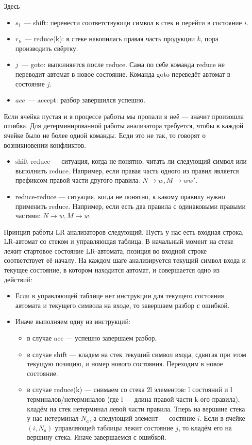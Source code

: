 Здесь
\begin{itemize}
  \item $s_i$~--- shift: перенести соответствующи символ в стек и перейти в состояние $i$.
  \item $r_k$~--- reduce(k): в стеке накопилась правая часть продукции $k$, пора производить свёртку.  
  \item $j$~--- goto: выполняется после reduce. Сама по себе команда reduce не переводит автомат в новое состояние. Команда goto переведёт автомат в состояние $j$.
  \item $acc$~--- accept: разбор завершился успешно. 
\end{itemize}

Если ячейка пустая и в процессе работы мы пропали в неё --- значит произошла ошибка. Для детерминированной работы анализатора требуется, чтобы в каждой ячейке было не более одной команды. Есди это не так, то говорят о возникновении конфликтов.

\begin{itemize}
\item shift-reduce --- ситуация, когда не понятно, читать ли следующий символ или выполнить reduce. Например, если правая часть одного из правил является префиксом правой части другого правила: $N \rightarrow w, M \rightarrow ww'$.
\item reduce-reduce --- ситуация, когда не понятно, к какому правилу нужно применить reduce. Например, если есть два правила с одинаковыми правыми частями: $N \rightarrow w, M \rightarrow w$.
\end{itemize}

Принцип работы LR анализаторов следующий. Пусть у нас есть входная строка, LR-автомат со стеком и управляющая таблица. 
В начальный момент на стеке лежит стартовое состояние LR-автомата, позиция во входной строке соответствует её началу.
На каждом шаге анализируется текущий символ входа и текущее состояние, в котором находится автомат, и совершается одно из действий: 
\begin{itemize}
\item Если в управляющей таблице нет инструкции для текущего состояния автомата и текущего символа на входе, то завершаем разбор с ошибкой.
\item Иначе выполняем одну из инструкций: 
\begin{itemize}
\item в случае acc --- успешно завершаем разбор.
\item в случае shift --- кладем на стек текущий символ входа, сдвигая при этом текущую позицию, и номер нового состояния. Переходим в новое состояние. 
\item в случае reduce(k) --- снимаем со стека 2l элементов: l состояний и l терминалов/нетерминалов (где l --- длина правой части k-ого правила), кладём на стек нетерминал левой части правила. Тперь на вершине стека у нас нетерминал $N_a$, а следующий элемент --- состяние $i$. Если в ячейке $(i,N_a)$ управляющей таблицы лежит состояние $j$, то кладём его на вершину стека. Иначе завершаемся с ошибкой.
\end{itemize}
\end{itemize}


